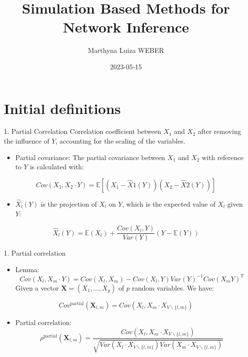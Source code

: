 \documentclass[
  ignorenonframetext,
]{beamer}
\title{Simulation Based Methods for Network Inference}
\author{Marthyna Luiza WEBER}
\date{2023-05-15}
\institute{Grenoble INP - Ensimag}
\providecommand{\tightlist}{%
  \setlength{\itemsep}{0pt}\setlength{\parskip}{0pt}}
\begin{document}
\frame{\titlepage}

\begin{frame}
\tableofcontents
\end{frame}

\hypertarget{initial-definitions}{%
\section{Initial definitions}\label{initial-definitions}}

\begin{frame}{1. Partial Correlation}
\protect\hypertarget{partial-correlation}{}
Correlation coefficient between \(X_1\) and \(X_2\) after removing the
influence of \(Y\), accounting for the scaling of the variables.

\begin{itemize}
\tightlist
\item
  Partial covariance: The partial covariance between \(X_1\) and \(X_2\)
  with reference to \(Y\) is calculated with:
\end{itemize}

\[
Cov(X_1, X_2 \cdot Y) = \mathbb{E}[(X_1 - \hat{X}1(Y))(X_2 - \hat{X}2(Y))]
\]

\begin{itemize}
\tightlist
\item
  \(\hat{X}_l(Y)\) is the projection of \(X_l\) on \(Y\), which is the
  expected value of \(X_l\) given \(Y\):
\end{itemize}

\[
\hat{X}_l(Y) = \mathbb{E}(X_l)+\frac{Cov(X_l,Y)}{Var(Y)}(Y-\mathbb{E}(Y))
\]
\end{frame}

\begin{frame}{1. Partial correlation}
\protect\hypertarget{partial-correlation-1}{}
\begin{itemize}
\tightlist
\item
  Lemma:
  \[ Cov(X_\mathit{l},X_\mathit{m}\cdot Y) = Cov(X_\mathit{l},X_\mathit{m}) - Cov(X_\mathit{l},Y)Var(Y)^{-1}Cov(X_\mathit{m}Y)^T \]
  \small Given a vector \(\mathbf{X} = (X_1, \ldots, X_p)\) of \(p\)
  random variables. We have:
\end{itemize}

\[ Cov^{\text{partial}}(\mathbf{X}_{\mathit{l,m}}) = Cov(X_\mathit{l},X_\mathit{m}\cdot X_{\mathit{V\backslash\{l,m\}}}) \]

\begin{itemize}
\tightlist
\item
  Partial correlation:
  \[ \rho^{\text{partial}}(\mathbf{X}_{\mathit{l,m}})=\frac{Cov(X_\mathit{l},X_\mathit{m}\cdot X_{\mathit{V\backslash\{l,m\}}})}{\sqrt{Var(X_\mathit{l} \cdot X_{\mathit{V\backslash\{l,m\}}}) Var(X_\mathit{m} \cdot X_{\mathit{V\backslash\{l,m\}}})}} \]
\end{itemize}
\end{frame}
\end{document}
